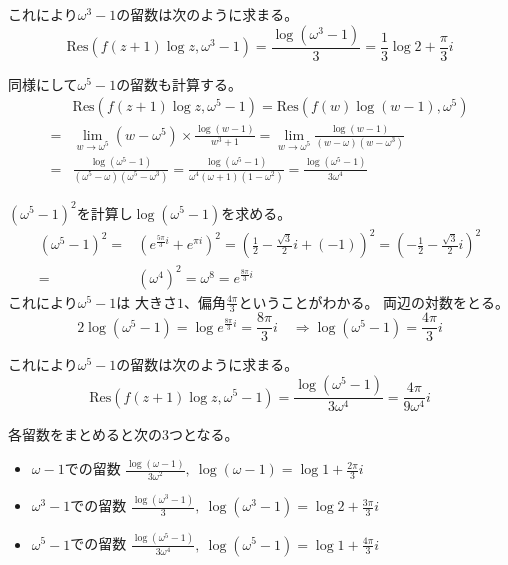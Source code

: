 \documentclass[12pt,b5paper]{ltjsarticle}
\begin{document}
これにより$\omega^3-1$の留数は次のように求まる。
\begin{equation}
 \mathrm{Res}(f(z+1)\log{z},\omega^3-1)
  =
 \frac{\log{(\omega^3-1)}}{3}
  =
 \frac{1}{3}\log{2} + \frac{\pi}{3} i
\end{equation}


同様にして$\omega^5-1$の留数も計算する。
\begin{align}
 & \mathrm{Res}(f(z+1)\log{z},\omega^5-1)
 =
 \mathrm{Res}(f(w)\log{(w-1)},\omega^5)\\
 =&
 \lim_{w\to \omega^5}(w-\omega^5)\times \frac{\log{(w-1)}}{w^3+1}
  =
 \lim_{w\to \omega^5} \frac{\log{(w-1)}}{(w-\omega)(w-\omega^3)}\\
 =&
 \frac{\log{(\omega^5-1)}}{(\omega^5-\omega)(\omega^5-\omega^3)}
 =
 \frac{\log{(\omega^5-1)}}{\omega^4(\omega +1)(1-\omega^2)}
 =
 \frac{\log{(\omega^5-1)}}{3\omega^4}
\end{align}

$(\omega^5-1)^2$を計算し$\log{(\omega^5-1)}$を求める。
\begin{align}
 (\omega^5-1)^2
  =& (e^{\frac{5\pi}{3}i} + e^{\pi i})^2
  = \left( \frac{1}{2}-\frac{\sqrt{3}}{2}i + (-1) \right)^2
  = \left( -\frac{1}{2}-\frac{\sqrt{3}}{2}i \right)^2\\
  =& (\omega^4)^2
  = \omega^8
  = e^{\frac{8\pi}{3}i}
\end{align}
これにより$\omega^5-1$は
大きさ$1$、偏角$\frac{4\pi}{3}$ということがわかる。
両辺の対数をとる。
\begin{equation}
 2\log{(\omega^5-1)}
  = \log{ e^{\frac{8\pi}{3}i} }
  = \frac{8\pi}{3}i
  \quad \Rightarrow
  \log{(\omega^5-1)}
  = \frac{4\pi}{3}i
\end{equation}

これにより$\omega^5-1$の留数は次のように求まる。
\begin{equation}
 \mathrm{Res}(f(z+1)\log{z},\omega^5-1)
  =
 \frac{\log{(\omega^5-1)}}{3\omega^4}
  =
 \frac{4\pi}{9\omega^4}i
\end{equation}


各留数をまとめると次の3つとなる。
\begin{itemize}
 \item $\omega-1$での留数\quad
       $\frac{\log{(\omega-1)}}{3\omega^2}, \ \log{(\omega-1)}=\log{1}+\frac{2\pi}{3}i$
 \item $\omega^3-1$での留数\quad
       $\frac{\log{(\omega^3-1)}}{3}, \ \log{(\omega^3-1)}=\log{2}+\frac{3\pi}{3}i$
 \item $\omega^5-1$での留数\quad
       $\frac{\log{(\omega^5-1)}}{3\omega^4}, \ \log{(\omega^5-1)}=\log{1}+\frac{4\pi}{3}i$
\end{itemize}
\end{document}
